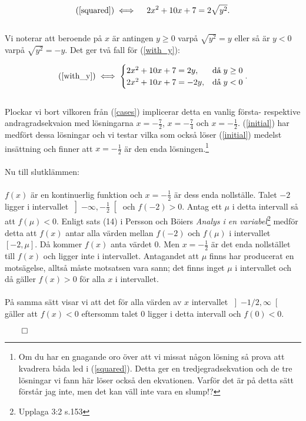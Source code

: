 \documentclass{article}
\begin{document}
\begin{gather}
  \text{(\ref{squared})} \iff \quad 2x^2 + 10x + 7 = 2\sqrt{y^2}\text{.} \label{with_y}
\end{gather}
\\
Vi noterar att beroende på $x$ är antingen $y \geq 0$ varpå $\sqrt{y^{2}} = y$ eller så är $y < 0$ varpå $\sqrt{y^{2}} = -y$. Det ger två fall för (\ref{with_y}):

\begin{align}
  \text{(\ref{with_y})} \iff
  \begin{cases}
    2x^{2} + 10x + 7 = 2y, & \text{då}\; y \geq 0 \\
    2x^{2} + 10x + 7 = -2y, & \text{då}\; y < 0
  \end{cases}\text{.} \label{cases}
\end{align}
\\
Plockar vi bort vilkoren från (\ref{cases}) implicerar detta en vanlig första- respektive andragradsekvaion med lösningarna $x = -\tfrac{7}{2}$, $x = -\tfrac{7}{4}$ och $x = -\tfrac{1}{2}$. (\ref{initial}) har medfört dessa lösningar och vi testar vilka som också löser (\ref{initial}) medelst insättning och finner att $x = -\tfrac{1}{2}$ är den enda lösningen.\footnote{Om du har en gnagande oro över att vi missat någon lösning så prova att kvadrera båda led i (\ref{squared}). Detta ger en tredjegradsekvation och de tre lösningar vi fann här löser också den ekvationen. Varför det är på detta sätt förstår jag inte, men det kan väll inte vara en slump!?}
\\
\\
Nu till slutklämmen:
\\
\\
$f(x)$ är en kontinuerlig funktion och $x = -\tfrac{1}{2}$ är dess enda nollställe. Talet $-2$ ligger i intervallet $\left]-\infty, -\tfrac{1}{2}\right[$ och $f(-2) > 0$. Antag ett $\mu$ i detta intervall så att $f(\mu) < 0$. Enligt sats (14) i Persson och Böiers \emph{Analys i en variabel}\footnote{Upplaga 3:2 s.153} medför detta att $f(x)$ antar alla värden mellan $f(-2)$ och $f(\mu)$ i intervallet $\left[-2, \mu\right]$. Då kommer $f(x)$ anta värdet $0$. Men $x = -\tfrac{1}{2}$ är det enda nollstället till $f(x)$ och ligger inte i intervallet. Antagandet att $\mu$ finns har producerat en motsägelse, alltså måste motsatsen vara sann; det finns inget $\mu$ i intervallet och då gäller $f(x) > 0$ för alla $x$ i intervallet.
\\
\\På samma sätt visar vi att det för alla värden av $x$ intervallet $ \left]-1/2, \infty\right[$ gäller att $f(x) < 0$ eftersomm talet $0$ ligger i detta intervall och $f(0) < 0$.

\centerline{$\qed$}
\end{document}
